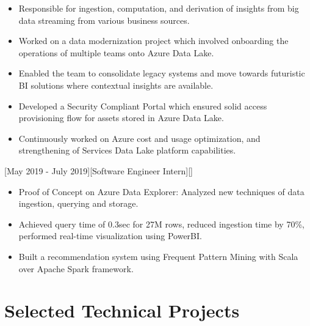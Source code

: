 \documentclass{article}
\begin{document}
\begin{itemize}
\item Responsible for ingestion, computation, and derivation of insights from big data streaming from various business sources.
\item Worked on a data modernization project which involved onboarding the operations of multiple teams onto Azure Data Lake.
\item Enabled the team to consolidate legacy systems and move towards futuristic BI solutions where contextual insights are available. 
\item Developed a Security Compliant Portal which ensured solid access provisioning flow for assets stored in Azure Data Lake.
\item Continuously worked on Azure cost and usage optimization, and strengthening of Services Data Lake platform capabilities.
\end{itemize}

[May 2019 - July 2019][Software Engineer Intern][]

\begin{itemize}
\item Proof of Concept on Azure Data Explorer: Analyzed new techniques of data ingestion, querying and storage. 
\item Achieved query time of 0.3sec for 27M rows, reduced ingestion time by 70\%, performed real-time visualization using PowerBI.
\item Built a recommendation system using Frequent Pattern Mining with Scala over Apache Spark framework.

\end{itemize}





\section{Selected Technical Projects}
\end{document}
